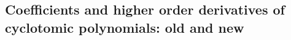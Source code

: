 \documentclass[10pt,compress]{beamer}
\begin{document}

\subsection{Coefficients and higher order derivatives of cyclotomic polynomials: old and new}
\end{document}
